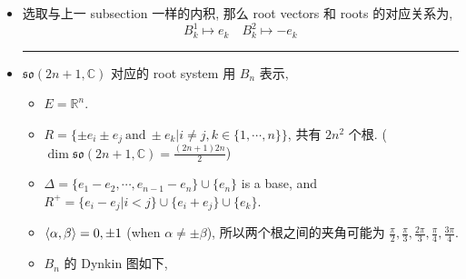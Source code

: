 \begin{itemize}
	\item 选取与上一 subsection 一样的内积, 那么 root vectors 和 roots 的对应关系为,
	\begin{equation}
		B^1_k \mapsto e_k \quad B^2_k \mapsto - e_k
	\end{equation}
	
	\noindent\rule[0.5ex]{\linewidth}{0.5pt} %
	
	\item $\mathfrak{so}(2 n + 1, \mathbb{C})$ 对应的 root system 用 $B_n$ 表示,
	\begin{itemize}
		\item $E = \mathbb{R}^n$.
		
		\item $R = \{\pm e_i \pm e_j \ \text{and} \ \pm e_k | i \neq j, k \in \{1, \cdots, n\}\}$, 共有 $2 n^2$ 个根. ($\dim \mathfrak{so}(2 n + 1, \mathbb{C}) = \frac{(2 n + 1) 2 n}{2}$)
		
		\item $\Delta = \{e_1 - e_2, \cdots, e_{n - 1} - e_n\} \cup \{e_n\}$ is a base, and $R^+ = \{e_i - e_j | i < j\} \cup \{e_i + e_j\} \cup \{e_k\}$.
		
		\item $\braket{\alpha, \beta} = 0, \pm 1$ (when $\alpha \neq \pm \beta$), 所以两个根之间的夹角可能为 $\frac{\pi}{2}, \frac{\pi}{3}, \frac{2 \pi}{3}, \frac{\pi}{4}, \frac{3 \pi}{4}$.
		
		\item $B_n$ 的 Dynkin 图如下,
		

\end{itemize}
\end{itemize}
